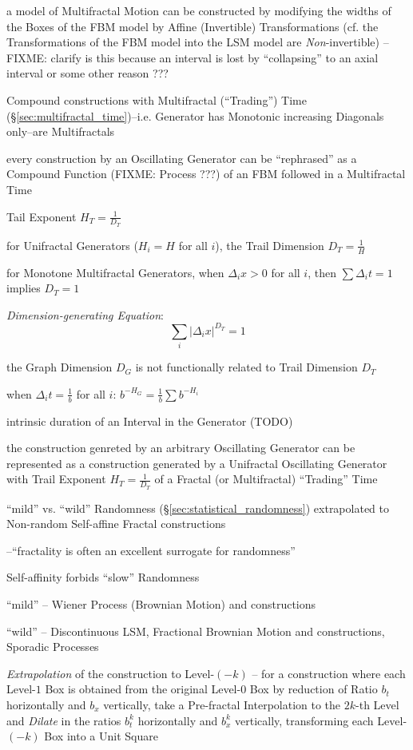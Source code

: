 a model of Multifractal Motion can be constructed by modifying the widths of the
Boxes of the FBM model by Affine (Invertible) Transformations (cf. the
Transformations of the FBM model into the LSM model are \emph{Non}-invertible)
--FIXME: clarify is this because an interval is lost by ``collapsing'' to an
axial interval or some other reason ???

Compound constructions with Multifractal (``Trading'') Time
(\S\ref{sec:multifractal_time})--i.e. Generator has Monotonic increasing
Diagonals only--are Multifractals

every construction by an Oscillating Generator can be ``rephrased'' as a
Compound Function (FIXME: Process ???) of an FBM followed in a Multifractal Time

Tail Exponent $H_T = \frac{1}{D_T}$

for Unifractal Generators ($H_i = H$ for all $i$), the Trail Dimension
$D_T = \frac{1}{H}$

for Monotone Multifractal Generators, when $\Delta_i x > 0$ for all $i$, then
$\sum\Delta_i t = 1$ implies $D_T = 1$

\emph{Dimension-generating Equation}:
\[
  \sum_i |\Delta_i x|^{D_T} = 1
\]

the Graph Dimension $D_G$ is not functionally related to Trail Dimension $D_T$

when $\Delta_i t = \frac{1}{b}$ for all $i$:
$b^{-H_G} = \frac{1}{b} \sum b^{-H_i}$

intrinsic duration of an Interval in the Generator (TODO)

the construction genreted by an arbitrary Oscillating Generator can be
represented as a construction generated by a Unifractal Oscillating Generator
with Trail Exponent $H_T = \frac{1}{D_T}$ of a Fractal (or Multifractal)
``Trading'' Time

``mild'' vs. ``wild'' Randomness (\S\ref{sec:statistical_randomness})
extrapolated to Non-random Self-affine Fractal constructions

--``fractality is often an excellent surrogate for randomness''

Self-affinity forbids ``slow'' Randomness

``mild'' -- Wiener Process (Brownian Motion) and constructions

``wild'' -- Discontinuous LSM, Fractional Brownian Motion and constructions,
Sporadic Processes

\emph{Extrapolation} of the construction to Level-$(-k)$ -- for a construction
where each Level-$1$ Box is obtained from the original Level-$0$ Box by
reduction of Ratio $b_t$ horizontally and $b_x$ vertically, take a Pre-fractal
Interpolation to the $2k$-th Level and \emph{Dilate} in the ratios $b_t^k$
horizontally and $b_x^k$ vertically, transforming each Level-$(-k)$ Box into a
Unit Square

